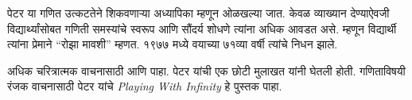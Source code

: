 \documentclass[../../../include/open-logic-section]{subfiles}
\begin{document}
पेटर या गणित उत्कटतेने शिकवणाऱ्या अध्यापिका म्हणून ओळखल्या जात. केवळ व्याख्यान देण्याऐवजी विद्यार्थ्यांसोबत गणिती समस्यांचे स्वरूप आणि सौंदर्य शोधणे त्यांना अधिक आवडत असे. म्हणून विद्यार्थी त्यांना प्रेमाने “रोझा मावशी” म्हणत. १९७७ मध्ये वयाच्या ७१व्या वर्षी त्यांचे निधन झाले.

\begin{reading}
अधिक चरित्रात्मक वाचनासाठी \citep{Oconnor2014} आणि \citep{Andrasfai1986} पाहा. पेटर यांची एक छोटी मुलाखत \citet{Tamassy1994} यांनी घेतली होती. गणिताविषयी रंजक वाचनासाठी पेटर यांचे \emph{Playing With Infinity} हे पुस्तक \citep{Peter2010} पाहा.
\end{reading}
\end{document}
